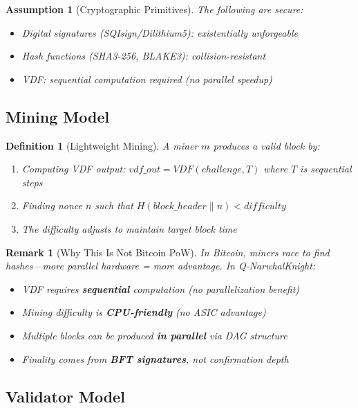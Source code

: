 \documentclass[11pt,a4paper]{article}
\newtheorem{definition}[theorem]{Definition}
\newtheorem{assumption}[theorem]{Assumption}
\newtheorem{remark}[theorem]{Remark}
\begin{document}
\begin{assumption}[Cryptographic Primitives]
\label{assum:crypto}
The following are secure:
\begin{itemize}
    \item Digital signatures (SQIsign/Dilithium5): existentially unforgeable
    \item Hash functions (SHA3-256, BLAKE3): collision-resistant
    \item VDF: sequential computation required (no parallel speedup)
\end{itemize}
\end{assumption}

\subsection{Mining Model}

\begin{definition}[Lightweight Mining]
A miner $m$ produces a valid block by:
\begin{enumerate}
    \item Computing VDF output: $vdf\_out = VDF(challenge, T)$ where $T$ is sequential steps
    \item Finding nonce $n$ such that $H(block\_header \| n) < difficulty$
    \item The difficulty adjusts to maintain target block time
\end{enumerate}
\end{definition}

\begin{remark}[Why This Is Not Bitcoin PoW]
In Bitcoin, miners race to find hashes---more parallel hardware = more advantage. In Q-NarwhalKnight:
\begin{itemize}
    \item VDF requires \textbf{sequential} computation (no parallelization benefit)
    \item Mining difficulty is \textbf{CPU-friendly} (no ASIC advantage)
    \item Multiple blocks can be produced \textbf{in parallel} via DAG structure
    \item Finality comes from \textbf{BFT signatures}, not confirmation depth
\end{itemize}
\end{remark}

\subsection{Validator Model}
\end{document}

